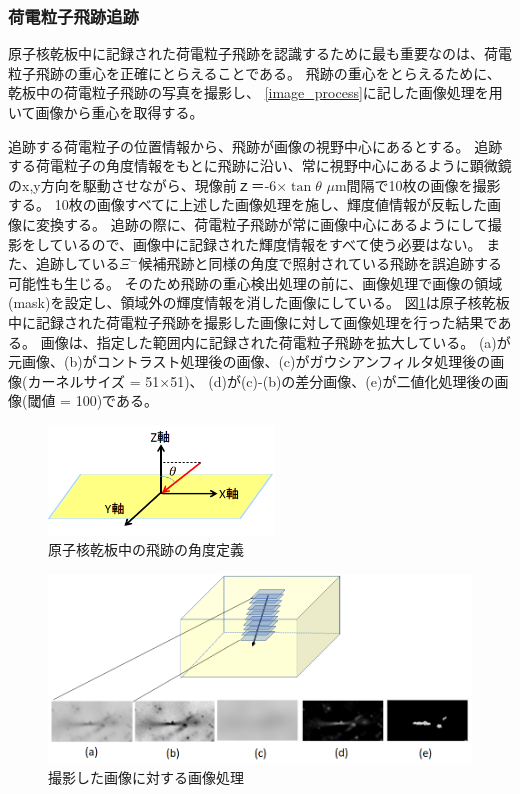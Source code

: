 \documentclass[12pt,a4paper]{jarticle}
\begin{document}
\subsubsection{荷電粒子飛跡追跡}\label{track_following}
原子核乾板中に記録された荷電粒子飛跡を認識するために最も重要なのは、荷電粒子飛跡の重心を正確にとらえることである。
飛跡の重心をとらえるために、乾板中の荷電粒子飛跡の写真を撮影し、
\ref{image_process}に記した画像処理を用いて画像から重心を取得する。
\par
追跡する荷電粒子の位置情報から、飛跡が画像の視野中心にあるとする。
追跡する荷電粒子の角度情報をもとに飛跡に沿い、常に視野中心にあるように顕微鏡のx,y方向を駆動させながら、現像前ｚ＝-6×$\tan$$\theta$ $\mu$m間隔で10枚の画像を撮影する。
10枚の画像すべてに上述した画像処理を施し、輝度値情報が反転した画像に変換する。
追跡の際に、荷電粒子飛跡が常に画像中心にあるようにして撮影をしているので、画像中に記録された輝度情報をすべて使う必要はない。
また、追跡している$\Xi$$^-$候補飛跡と同様の角度で照射されている飛跡を誤追跡する可能性も生じる。
そのため飛跡の重心検出処理の前に、画像処理で画像の領域(mask)を設定し、領域外の輝度情報を消した画像にしている。
図\ref{fig:tuiseki_gazou}は原子核乾板中に記録された荷電粒子飛跡を撮影した画像に対して画像処理を行った結果である。
画像は、指定した範囲内に記録された荷電粒子飛跡を拡大している。
(a)が元画像、(b)がコントラスト処理後の画像、(c)がガウシアンフィルタ処理後の画像(カーネルサイズ = 51×51)、
(d)が(c)-(b)の差分画像、(e)が二値化処理後の画像(閾値 = 100)である。
\begin{figure}[htbp]
  \centering
     \includegraphics[width=60mm]{angle_in_eml.png}
  \caption{原子核乾板中の飛跡の角度定義}
\end{figure}
\begin{figure}[htbp]
  \centering
     \includegraphics[width=120mm]{tuiseki_gazou.png}
  \caption{撮影した画像に対する画像処理\label{fig:tuiseki_gazou}}
\end{figure}
\end{document}

